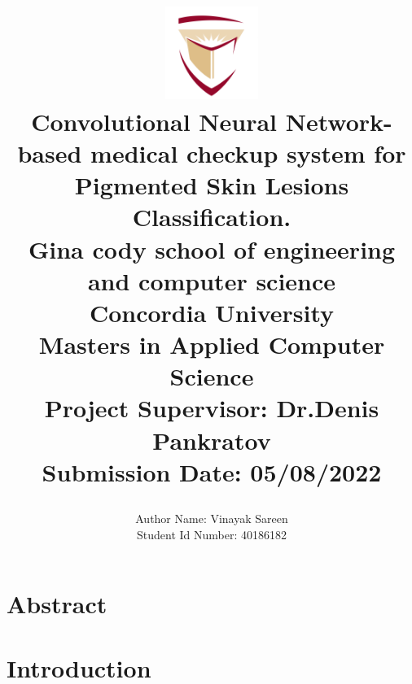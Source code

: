 \documentclass[]{report}
\title{
	\begin{center}
	\includegraphics[width=3cm]{assets/concordia-logo.png} \\
	\vspace{2mm}
	{Convolutional Neural Network-based medical checkup system for Pigmented Skin Lesions Classification.} \\
	\vspace{5mm} %
	\large {
		{Gina cody school of engineering and computer science}\\
		{Concordia University}\\
	}
	\vspace{3mm} %
	\textbf{ Masters in Applied Computer Science}\\
	{\large Project Supervisor: Dr.Denis Pankratov}\\
	{\large Submission Date: 05/08/2022} \\
	\end{center}
}
\author{
	{\large Author Name:  Vinayak Sareen} \\
	{\large Student Id Number:  40186182} \\
}
\date{}
\begin{document}
\maketitle

\chapter*{Abstract}


\pagebreak
% 

\tableofcontents
\onehalfspacing
\chapter{Introduction}


% 



\pagebreak
\thispagestyle{plain}
\end{document}
